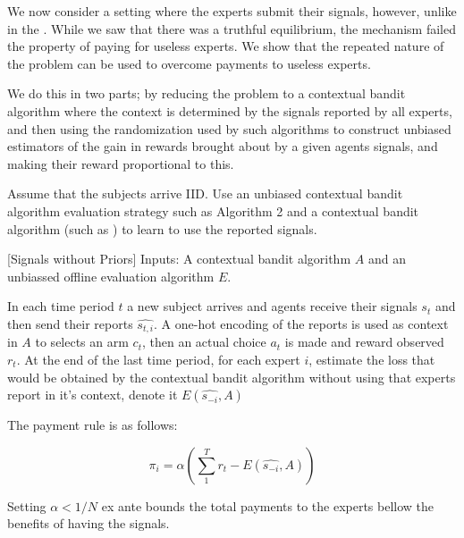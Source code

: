 We now consider a setting where the experts submit their signals, however, unlike in the .
 While we saw that there was a truthful equilibrium, the mechanism failed the property of paying for useless experts. We show that the repeated nature of the problem can be used to overcome payments to useless experts. 

We do this in two parts; by reducing the problem to a contextual bandit algorithm where the context is determined by the signals reported by all experts, and then using the randomization used by such algorithms to construct unbiased estimators of the gain in rewards brought about by a given agents signals, and making their reward proportional to this.


Assume that the subjects arrive IID. Use an unbiased contextual bandit algorithm evaluation strategy such as \cite{li2011unbiased}  Algorithm 2 and a contextual bandit algorithm (such as \cite{syrgkanis2016efficient}) to learn to use the reported signals. %


\begin{mech}\label{mech:bandit}[Signals without Priors]
Inputs: A contextual bandit algorithm $A$ and an unbiassed offline evaluation algorithm $E$.

In each time period $t$ a new subject arrives and agents receive their signals $s_t$ and then send their reports $\hat{s_{t,i}}$. A one-hot encoding of the reports is used as context in $A$ to selects an arm $c_t$, then an actual choice $a_t$ is made and reward observed $r_t$.
At the end of the last time period, for each expert $i$, estimate the loss that would be obtained by the contextual bandit algorithm without using that experts report in it's context, denote it $E(\hat{s_{-i}},A)$
 
The payment rule is as follows:

\[
    \pi_i =  \alpha (\sum_1^T r_t -  E(\hat{s_{-i}},A))
\]

Setting $\alpha<1/N$ ex ante bounds the total payments to the experts bellow the benefits of having the signals.

\end{mech}


